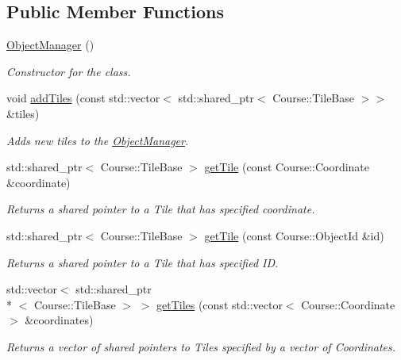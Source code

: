 \subsection*{Public Member Functions}
\begin{DoxyCompactItemize}
\item 
\hypertarget{classObjectManager_a6fa9372c7c3a8da88412f4158ca3dfd9}{\hyperlink{classObjectManager_a6fa9372c7c3a8da88412f4158ca3dfd9}{Object\-Manager} ()}\label{classObjectManager_a6fa9372c7c3a8da88412f4158ca3dfd9}

\begin{DoxyCompactList}\small\item\em Constructor for the class. \end{DoxyCompactList}\item 
void \hyperlink{classObjectManager_a00b483db15dd68a6da5b6dd42a3cdfe0}{add\-Tiles} (const std\-::vector$<$ std\-::shared\-\_\-ptr$<$ Course\-::\-Tile\-Base $>$$>$ \&tiles)
\begin{DoxyCompactList}\small\item\em Adds new tiles to the \hyperlink{classObjectManager}{Object\-Manager}. \end{DoxyCompactList}\item 
std\-::shared\-\_\-ptr$<$ Course\-::\-Tile\-Base $>$ \hyperlink{classObjectManager_a5e9109ea92cf452ffdf02ed8cc6f8260}{get\-Tile} (const Course\-::\-Coordinate \&coordinate)
\begin{DoxyCompactList}\small\item\em Returns a shared pointer to a Tile that has specified coordinate. \end{DoxyCompactList}\item 
std\-::shared\-\_\-ptr$<$ Course\-::\-Tile\-Base $>$ \hyperlink{classObjectManager_a1bc804e3771e3a40bce0cc462ec35b97}{get\-Tile} (const Course\-::\-Object\-Id \&id)
\begin{DoxyCompactList}\small\item\em Returns a shared pointer to a Tile that has specified I\-D. \end{DoxyCompactList}\item 
std\-::vector$<$ std\-::shared\-\_\-ptr\\*
$<$ Course\-::\-Tile\-Base $>$ $>$ \hyperlink{classObjectManager_a891e222168b45f7cacb522852fb45cf1}{get\-Tiles} (const std\-::vector$<$ Course\-::\-Coordinate $>$ \&coordinates)
\begin{DoxyCompactList}\small\item\em Returns a vector of shared pointers to Tiles specified by a vector of Coordinates. \end{DoxyCompactList}\item 
$$
\end{DoxyCompactItemize}
